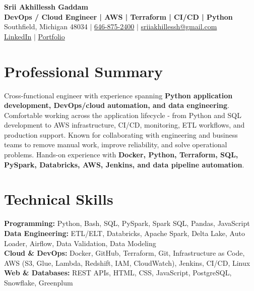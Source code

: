 \documentclass[letterpaper,10pt]{article}
\begin{document}
\fontsize{9.35pt}{10.45pt}\selectfont

\begin{center}
    {\LARGE \textbf{Srii Akhillessh Gaddam}} \\[-1pt]
    \textbf{DevOps / Cloud Engineer | AWS | Terraform | CI/CD | Python} \\[2pt]
    Southfield, Michigan 48034 $|$
    \href{tel:6468752400}{646-875-2400} $|$
    \href{mailto:sriiakhillessh@gmail.com}{sriiakhillessh@gmail.com} \\[1pt]
    \href{https://www.linkedin.com/in/srii-akhiilessh-gaddam-b48668191/}{LinkedIn} $|$
    \href{https://sriiakhillesshg.github.io/portfolio/}{Portfolio}
\end{center}
\vspace{-8pt}

\section{Professional Summary}
\small{Cross-functional engineer with experience spanning \textbf{Python application development, DevOps/cloud automation, and data engineering}. Comfortable working across the application lifecycle - from Python and SQL development to AWS infrastructure, CI/CD, monitoring, ETL workflows, and production support. Known for collaborating with engineering and business teams to remove manual work, improve reliability, and solve operational problems. Hands-on experience with \textbf{Docker, Python, Terraform, SQL, PySpark, Databricks, AWS, Jenkins, and data pipeline automation}.}

\section{Technical Skills}
\small{
\textbf{Programming:} Python, Bash, SQL, PySpark, Spark SQL, Pandas, JavaScript \\
\textbf{Data Engineering:} ETL/ELT, Databricks, Apache Spark, Delta Lake, Auto Loader, Airflow, Data Validation, Data Modeling \\
\textbf{Cloud \& DevOps:} Docker, GitHub, Terraform, Git, Infrastructure as Code, AWS (S3, Glue, Lambda, Redshift, IAM, CloudWatch), Jenkins, CI/CD, Linux \\
\textbf{Web \& Databases:} REST APIs, HTML, CSS, JavaScript, PostgreSQL, Snowflake, Greenplum
}
\end{document}
